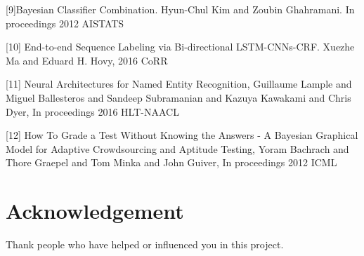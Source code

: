 \documentclass{article}
\begin{document}
[9]Bayesian Classifier Combination. Hyun-Chul Kim and Zoubin Ghahramani. In proceedings 2012 AISTATS

[10] End-to-end Sequence Labeling via Bi-directional LSTM-CNNs-CRF. Xuezhe Ma and Eduard H. Hovy, 2016 CoRR

[11] Neural Architectures for Named Entity Recognition, Guillaume Lample and Miguel Ballesteros and Sandeep Subramanian and Kazuya Kawakami and Chris Dyer, In proceedings 2016 HLT-NAACL

[12] How To Grade a Test Without Knowing the Answers - A Bayesian Graphical Model for Adaptive Crowdsourcing and Aptitude Testing, Yoram Bachrach and Thore Graepel and Tom Minka and John Guiver, In proceedings 2012 ICML

\section*{Acknowledgement}
Thank people who have helped or influenced you in this project.

\nocite{*}



\end{document}
